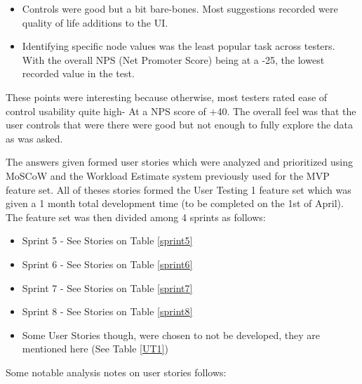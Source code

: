 \begin{itemize}
    \item Controls were good but a bit bare-bones. Most suggestions recorded were quality of life additions to the UI.
    \item Identifying specific node values was the least popular task across testers. With the overall NPS (Net Promoter Score) being at a -25, the lowest recorded value in the test.
\end{itemize}

These points were interesting because otherwise, most testers rated ease of control usability quite high- At a NPS score of +40. The overall feel was that the user controls that were there were good but not enough to fully explore the data as was asked.

The answers given formed user stories which were analyzed and prioritized using MoSCoW and the Workload Estimate system previously used for the MVP feature set. All of theses stories formed the User Testing 1 feature set which was given a 1 month total development time (to be completed on the 1st of April). The feature set was then divided among 4 sprints as follows:

\begin{itemize}
    \item Sprint 5 - See Stories on Table \ref{sprint5}
    \item Sprint 6 - See Stories on Table \ref{sprint6}
    \item Sprint 7 - See Stories on Table \ref{sprint7}
    \item Sprint 8 - See Stories on Table \ref{sprint8}
    \item Some User Stories though, were chosen to not be developed, they are mentioned here (See Table \ref{UT1})
\end{itemize}

Some notable analysis notes on user stories follows:

